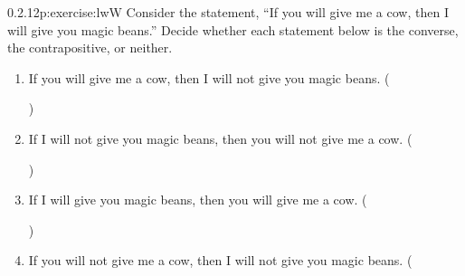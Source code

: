 \documentclass[twoside,11pt,]{book}
\numberwithin{equation}{chapter}
\begin{document}
\begin{divisionsolution}{0.2.12}{}{p:exercise:lwW}%
Consider the statement, ``If you will give me a cow, then I will give you magic beans.'' Decide whether each statement below is the converse, the contrapositive, or neither.%
\begin{enumerate}[label=(\alph*)]
\item{}If you will give me a cow, then I will not give you magic beans. \quad()\quad
%
\item{}If I will not give you magic beans, then you will not give me a cow. \quad()\quad
%
\item{}If I will give you magic beans, then you will give me a cow. \quad()\quad
%
\item{}If you will not give me a cow, then I will not give you magic beans. \quad(
\end{enumerate}
\end{divisionsolution}
\end{document}

